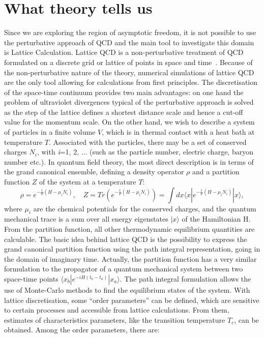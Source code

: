\section{What theory tells us}
\label{sec:Lattice}
Since we are exploring the region of asymptotic freedom, it is not possible to use the perturbative approach 
of QCD and the main tool to investigate this domain is Lattice Calculation. Lattice QCD is a non-perturbative 
treatment of QCD formulated on a discrete grid or lattice of points in space and time~\cite{Philipsen:2012nu}. 
Because of the non-perturbative nature of the theory, numerical simulations of lattice QCD are the only tool 
allowing for calculations from first principles. The discretisation of the space-time continuum provides two main 
advantages: on one hand the problem of ultraviolet divergences typical of the perturbative approach is solved 
as the step of the lattice defines a shortest distance scale and hence a cut-off value for the momentum scale. 
On the other hand, we wish to describe a system of particles in a finite volume $V$, which is in thermal contact 
with a heat bath at temperature $T$. Associated with the particles, there may be a set of conserved charges 
$N_i$, with \textit{i}=1, 2, ... (such as the particle number, electric charge, baryon number etc.). In quantum field 
theory, the most direct description is in terms of the grand canonical ensemble, defining a density operator $\rho$ and a partition function $Z$ of the system at a temperature $T$:
\begin{equation}
\rho =e^{-\frac{1}{T}(H-\mu_iN_i)},\quad Z=Tr(e^{-\frac{1}{T}(H-\mu_iN_i)})=  \int dx \langle x|e^{-\frac{1}{T}(H-\mu_iN_i)}|x\rangle,
\end{equation}
where $\mu_i$ are the chemical potentials for the conserved charges, and the quantum mechanical trace is a sum over 
all energy eigenstates $|x\rangle$ of the Hamiltonian H. 
From the partition function, all other thermodynamic equilibrium quantities are calculable. The basic idea behind lattice 
QCD is the possibility to express the grand canonical partition function using the path integral representation, going in the 
domain of imaginary time. Actually, the partition function has a very similar formulation to the propagator of a quantum 
mechanical system between two space-time points $\langle x_b|e^{-iH(t_b-t_a)}|x_a\rangle$. The path integral 
formulation allows the use of Monte-Carlo methods to find the equilibrium states of the system. 
With lattice discretisation, some ``order parameters'' can be defined, which are sensitive to certain processes and accessible from lattice calculations. From them, estimates of characteristics parameters, like the transition temperature $T_c$, can be obtained. Among the order parameters, there are:
